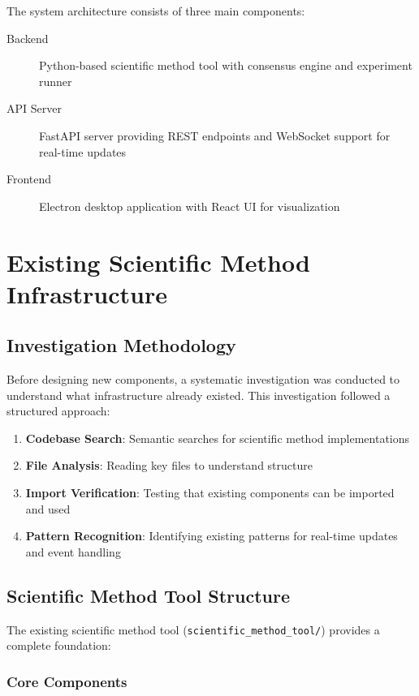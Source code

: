 \documentclass{book}
\begin{document}
The system architecture consists of three main components:

\begin{description}
    \item[Backend] Python-based scientific method tool with consensus engine and experiment runner
    \item[API Server] FastAPI server providing REST endpoints and WebSocket support for real-time updates
    \item[Frontend] Electron desktop application with React UI for visualization
\end{description}

\chapter{Existing Scientific Method Infrastructure}

\section{Investigation Methodology}

Before designing new components, a systematic investigation was conducted to understand what infrastructure already existed. This investigation followed a structured approach:

\begin{enumerate}
    \item \textbf{Codebase Search}: Semantic searches for scientific method implementations
    \item \textbf{File Analysis}: Reading key files to understand structure
    \item \textbf{Import Verification}: Testing that existing components can be imported and used
    \item \textbf{Pattern Recognition}: Identifying existing patterns for real-time updates and event handling
\end{enumerate}

\section{Scientific Method Tool Structure}

The existing scientific method tool (\texttt{scientific\_method\_tool/}) provides a complete foundation:

\subsection{Core Components}
\end{document}
